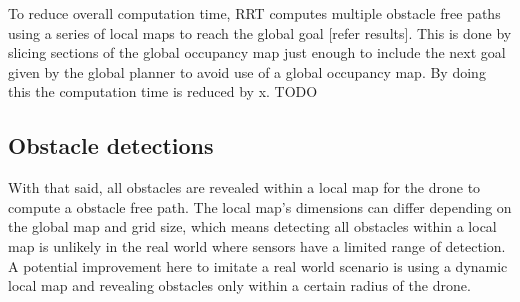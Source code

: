 To reduce overall computation time, RRT computes multiple obstacle free paths
using a series of local maps to reach the global goal [refer results]. This is done by slicing sections of the global occupancy map just enough to include the next goal given by the global planner to avoid use of a global occupancy map. By doing this the computation time is reduced by x. TODO \\ 

\subsection{Obstacle detections}
With that said, all obstacles are revealed within a local map for the drone to compute a obstacle free path. The local map's dimensions can differ depending on the global map and grid size, which means detecting all obstacles within a local map is unlikely in the real world where sensors have a limited range of detection. \\
 A potential improvement here to imitate a real world scenario is using a dynamic local map and revealing obstacles only within a certain radius of the drone.

